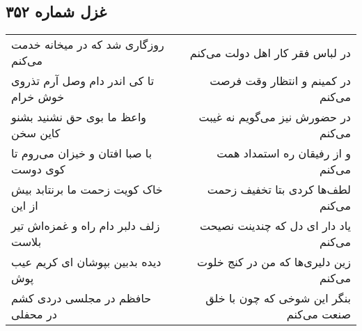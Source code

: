 \begin{center}
\section*{غزل شماره ۳۵۲}
\label{sec:sh352}
\begin{longtable}{l p{0.5cm} r}
روزگاری شد که در میخانه خدمت می‌کنم
&&
در لباس فقر کار اهل دولت می‌کنم
\\
تا کی اندر دام وصل آرم تذروی خوش خرام
&&
در کمینم و انتظار وقت فرصت می‌کنم
\\
واعظ ما بوی حق نشنید بشنو کاین سخن
&&
در حضورش نیز می‌گویم نه غیبت می‌کنم
\\
با صبا افتان و خیزان می‌روم تا کوی دوست
&&
و از رفیقان ره استمداد همت می‌کنم
\\
خاک کویت زحمت ما برنتابد بیش از این
&&
لطف‌ها کردی بتا تخفیف زحمت می‌کنم
\\
زلف دلبر دام راه و غمزه‌اش تیر بلاست
&&
یاد دار ای دل که چندینت نصیحت می‌کنم
\\
دیده بدبین بپوشان ای کریم عیب پوش
&&
زین دلیری‌ها که من در کنج خلوت می‌کنم
\\
حافظم در مجلسی دردی کشم در محفلی
&&
بنگر این شوخی که چون با خلق صنعت می‌کنم
\\
\end{longtable}
\end{center}
